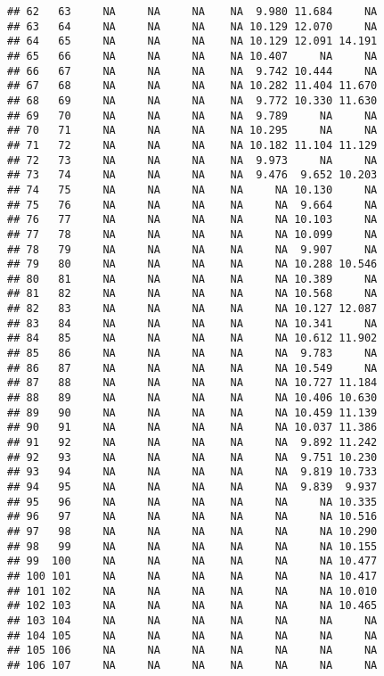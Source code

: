 \documentclass{article}\usepackage[]{graphicx}\usepackage[]{color}
\makeatletter
\newenvironment{kframe}{%
 \def\at@end@of@kframe{}%
 \ifinner\ifhmode%
  \def\at@end@of@kframe{\end{minipage}}%
  \begin{minipage}{\columnwidth}%
 \fi\fi%
 \def\FrameCommand##1{\hskip\@totalleftmargin \hskip-\fboxsep
 \colorbox{shadecolor}{##1}\hskip-\fboxsep
     \hskip-\linewidth \hskip-\@totalleftmargin \hskip\columnwidth}%
 \MakeFramed {\advance\hsize-\width
   \@totalleftmargin\z@ \linewidth\hsize
   \@setminipage}}%
 {\par\unskip\endMakeFramed%
 \at@end@of@kframe}
\newenvironment{knitrout}{}{} %
\makeatother
\begin{document}
\begin{knitrout}
\begin{kframe}
\begin{verbatim}
## 62   63     NA     NA     NA    NA  9.980 11.684     NA
## 63   64     NA     NA     NA    NA 10.129 12.070     NA
## 64   65     NA     NA     NA    NA 10.129 12.091 14.191
## 65   66     NA     NA     NA    NA 10.407     NA     NA
## 66   67     NA     NA     NA    NA  9.742 10.444     NA
## 67   68     NA     NA     NA    NA 10.282 11.404 11.670
## 68   69     NA     NA     NA    NA  9.772 10.330 11.630
## 69   70     NA     NA     NA    NA  9.789     NA     NA
## 70   71     NA     NA     NA    NA 10.295     NA     NA
## 71   72     NA     NA     NA    NA 10.182 11.104 11.129
## 72   73     NA     NA     NA    NA  9.973     NA     NA
## 73   74     NA     NA     NA    NA  9.476  9.652 10.203
## 74   75     NA     NA     NA    NA     NA 10.130     NA
## 75   76     NA     NA     NA    NA     NA  9.664     NA
## 76   77     NA     NA     NA    NA     NA 10.103     NA
## 77   78     NA     NA     NA    NA     NA 10.099     NA
## 78   79     NA     NA     NA    NA     NA  9.907     NA
## 79   80     NA     NA     NA    NA     NA 10.288 10.546
## 80   81     NA     NA     NA    NA     NA 10.389     NA
## 81   82     NA     NA     NA    NA     NA 10.568     NA
## 82   83     NA     NA     NA    NA     NA 10.127 12.087
## 83   84     NA     NA     NA    NA     NA 10.341     NA
## 84   85     NA     NA     NA    NA     NA 10.612 11.902
## 85   86     NA     NA     NA    NA     NA  9.783     NA
## 86   87     NA     NA     NA    NA     NA 10.549     NA
## 87   88     NA     NA     NA    NA     NA 10.727 11.184
## 88   89     NA     NA     NA    NA     NA 10.406 10.630
## 89   90     NA     NA     NA    NA     NA 10.459 11.139
## 90   91     NA     NA     NA    NA     NA 10.037 11.386
## 91   92     NA     NA     NA    NA     NA  9.892 11.242
## 92   93     NA     NA     NA    NA     NA  9.751 10.230
## 93   94     NA     NA     NA    NA     NA  9.819 10.733
## 94   95     NA     NA     NA    NA     NA  9.839  9.937
## 95   96     NA     NA     NA    NA     NA     NA 10.335
## 96   97     NA     NA     NA    NA     NA     NA 10.516
## 97   98     NA     NA     NA    NA     NA     NA 10.290
## 98   99     NA     NA     NA    NA     NA     NA 10.155
## 99  100     NA     NA     NA    NA     NA     NA 10.477
## 100 101     NA     NA     NA    NA     NA     NA 10.417
## 101 102     NA     NA     NA    NA     NA     NA 10.010
## 102 103     NA     NA     NA    NA     NA     NA 10.465
## 103 104     NA     NA     NA    NA     NA     NA     NA
## 104 105     NA     NA     NA    NA     NA     NA     NA
## 105 106     NA     NA     NA    NA     NA     NA     NA
## 106 107     NA     NA     NA    NA     NA     NA     NA

\end{verbatim}
\end{kframe}
\end{knitrout}
\end{document}
